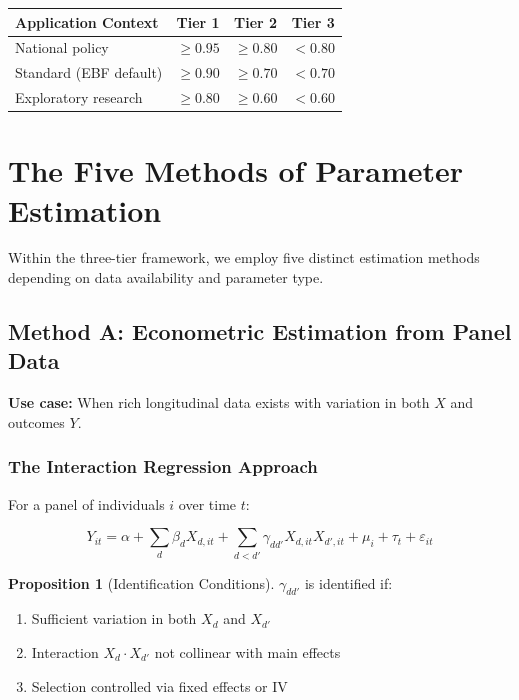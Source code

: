 \documentclass[11pt,a4paper]{article}
\theoremstyle{definition}
\newtheorem{proposition}{Proposition}[section]
\begin{document}
\begin{center}
\small
\begin{tabular}{@{}lccc@{}}
\toprule
\textbf{Application Context} & \textbf{Tier 1} & \textbf{Tier 2} & \textbf{Tier 3} \\
\midrule
National policy & $\geq 0.95$ & $\geq 0.80$ & $< 0.80$ \\
Standard (EBF default) & $\geq 0.90$ & $\geq 0.70$ & $< 0.70$ \\
Exploratory research & $\geq 0.80$ & $\geq 0.60$ & $< 0.60$ \\
\bottomrule
\end{tabular}
\end{center}



\section{The Five Methods of Parameter Estimation}
\label{sec:bbb-methods}

Within the three-tier framework, we employ five distinct estimation methods 
depending on data availability and parameter type.

\subsection{Method A: Econometric Estimation from Panel Data}

\textbf{Use case:} When rich longitudinal data exists with variation in both 
$X$ and outcomes $Y$.

\subsubsection{The Interaction Regression Approach}

For a panel of individuals $i$ over time $t$:

\begin{equation}
Y_{it} = \alpha + \sum_d \beta_d X_{d,it} + \sum_{d < d'} \gamma_{dd'} X_{d,it} X_{d',it} + \mu_i + \tau_t + \varepsilon_{it}
\label{eq:interaction-regression}
\end{equation}

\begin{proposition}[Identification Conditions]
\label{prop:gamma-id}
$\gamma_{dd'}$ is identified if:
\begin{enumerate}
    \item Sufficient variation in both $X_d$ and $X_{d'}$
    \item Interaction $X_d \cdot X_{d'}$ not collinear with main effects
    \item Selection controlled via fixed effects or IV
\end{enumerate}
\end{proposition}
\end{document}

